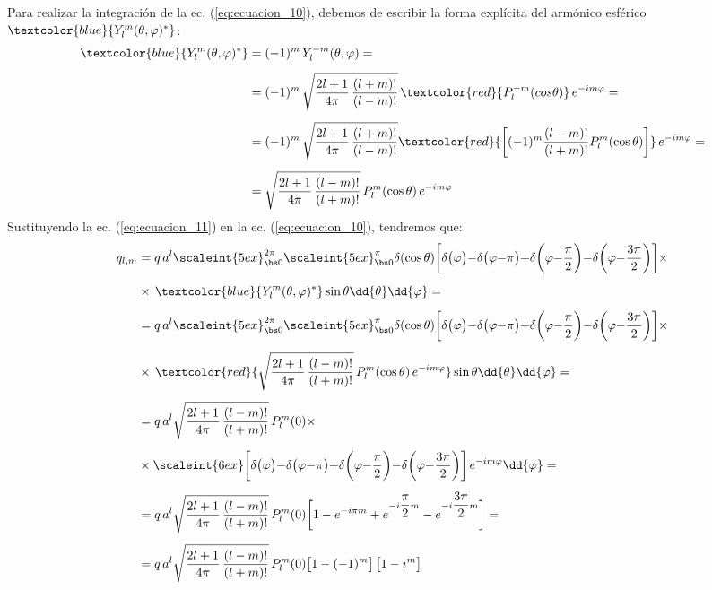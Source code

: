 Para realizar la integración de la ec. (\ref{eq:ecuacion_10}), debemos de escribir la forma explícita del armónico esférico $\textcolor{blue}{Y_{l}^{m} (\theta, \varphi)^{*}}$:
\begin{align}
\begin{aligned}[b]
\textcolor{blue}{Y_{l}^{m} (\theta, \varphi)^{*}} &= (-1)^{m} \, Y_{l}^{-m} (\theta, \varphi) = \\[0.5em]
&= (-1)^{m} \, \sqrt{\dfrac{2 l + 1}{4 \pi} \, \dfrac{(l + m)!}{(l - m)!}} \, \textcolor{red}{P_{l}^{-m} (cos \theta)} \, e^{-i m \varphi} = \\[0.5em]
&= (-1)^{m} \, \sqrt{\dfrac{2 l + 1}{4 \pi} \, \dfrac{(l + m)!}{(l - m)!}} \textcolor{red}{\bigg[ (-1)^{m} \dfrac{(l - m)!}{(l + m)!} P_{l}^{m} (\cos \theta) \bigg]} \, e^{-i m \varphi} = \\[0.5em]
&= \sqrt{\dfrac{2 l + 1}{4 \pi} \, \dfrac{(l - m)!}{(l + m)!}} \, P_{l}^{m} (\cos \theta) \, e^{-i m \varphi} 
\end{aligned}
\label{eq:ecuacion_11}
\end{align}
Sustituyendo la ec. (\ref{eq:ecuacion_11}) en la ec. (\ref{eq:ecuacion_10}), tendremos que:
\begin{align*}
q_{l, m} &= q \, a^{l} \scaleint{5ex}_{\bs 0}^{2 \pi} \scaleint{5ex}_{\bs 0}^{\pi} \delta(\cos \theta) \bigg[ \delta \big(\varphi \big) {-} \delta \big(\varphi {-} \pi \big) {+} \delta \bigg( \varphi {-} \dfrac{\pi}{2} \bigg) {-} \delta \bigg(\varphi {-} \dfrac{3 \pi}{2} \bigg) \bigg] \times \\[0.5em]
&\times \, \textcolor{blue}{Y_{l}^{m} (\theta, \varphi)^{*}} \sin \theta \dd{\theta} \dd{\varphi} = \\[0.5em]
&= q \, a^{l} \scaleint{5ex}_{\bs 0}^{2 \pi} \scaleint{5ex}_{\bs 0}^{\pi} \delta(\cos \theta) \bigg[ \delta \big(\varphi \big) {-} \delta \big(\varphi {-} \pi \big) {+} \delta \bigg( \varphi {-} \dfrac{\pi}{2} \bigg) {-} \delta \bigg(\varphi {-} \dfrac{3 \pi}{2} \bigg) \bigg] \times \\[0.5em]
&\times \, \textcolor{red}{\sqrt{\dfrac{2 l + 1}{4 \pi} \, \dfrac{(l - m)!}{(l + m)!}} \, P_{l}^{m} (\cos \theta) \, e^{-i m \varphi}} \sin \theta \dd{\theta} \dd{\varphi} = \\[0.5em]
&= q \, a^{l} \sqrt{\dfrac{2 l + 1}{4 \pi} \, \dfrac{(l - m)!}{(l + m)!}} \, P_{l}^{m} (0) \times \\[0.5em]
&\times \scaleint{6ex} \bigg[ \delta \big(\varphi \big) {-} \delta \big(\varphi {-} \pi \big) {+} \delta \bigg( \varphi {-} \dfrac{\pi}{2} \bigg) {-} \delta \bigg(\varphi {-} \dfrac{3 \pi}{2} \bigg) \bigg] \, e^{-i m \varphi} \dd{\varphi} = \\[0.5em]
&= q \, a^{l} \sqrt{\dfrac{2 l + 1}{4 \pi} \, \dfrac{(l - m)!}{(l + m)!}} \, P_{l}^{m} (0) \bigg[ 1 - e^{- i \pi m } + e^{- i  \dfrac{\pi}{2} m} - e^{- i  \dfrac{3 \pi}{2} m} \bigg] = \\[0.5em]
&= q \, a^{l} \sqrt{\dfrac{2 l + 1}{4 \pi} \, \dfrac{(l - m)!}{(l + m)!}} \, P_{l}^{m} (0) \big[ 1 - (-1)^{m} \big] \, \big[ 1 - i^{m} \big]
\end{align*}
